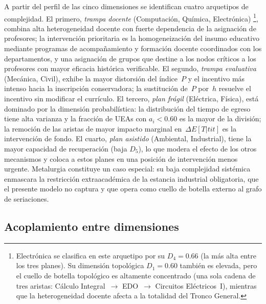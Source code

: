 \documentclass[11pt,letterpaper]{article}
\begin{document}
A partir del perfil de las cinco dimensiones se identifican cuatro arquetipos de complejidad.
El primero, \emph{trampa docente} (Computación, Química, Electrónica)%
\footnote{Electrónica se clasifica en este arquetipo por su
$D_4=0.66$ (la más alta entre los tres planes). Su dimensión
topológica $D_1=0.60$ también es elevada, pero el cuello de
botella topológico es altamente concentrado (una sola cadena de
tres aristas: Cálculo Integral~$\to$ EDO~$\to$ Circuitos Eléctricos~I),
mientras que la heterogeneidad docente afecta a
la totalidad del Tronco General.},
combina alta heterogeneidad
docente con fuerte dependencia de la asignación de profesores; la intervención prioritaria es la
homogeneización del insumo educativo mediante programas de acompañamiento y formación docente
coordinados con los departamentos, y una asignación de grupos que destine a los nodos críticos a
los profesores con mayor eficacia histórica verificable.
El segundo, \emph{trampa evaluativa} (Mecánica, Civil), exhibe la mayor distorsión del índice~$P$ y el
incentivo más intenso hacia la inscripción conservadora; la sustitución de~$P$ por~$h$ resuelve el
incentivo sin modificar el currículo.
El tercero, \emph{plan frágil} (Eléctrica, Física), está dominado por la dimensión probabilística:
la distribución del tiempo de egreso tiene alta varianza y la fracción de UEAs con $a_i<0.60$ es la
mayor de la división; la remoción de las aristas de mayor impacto marginal en~$\Delta E[T|tit]$ es la
intervención de fondo.
El cuarto, \emph{plan asistido} (Ambiental, Industrial), tiene la mayor capacidad de recuperación (baja
$D_5$), lo que modera el efecto de los otros mecanismos y coloca a estos planes en una posición de
intervención menos urgente.
Metalurgia constituye un caso especial: su baja complejidad sistémica enmascara la restricción
extraacadémica de la estancia industrial obligatoria, que el presente modelo no captura y que opera como
cuello de botella externo al grafo de seriaciones.

\subsection{Acoplamiento entre dimensiones}
\label{subsec:acoplamiento}
\end{document}
